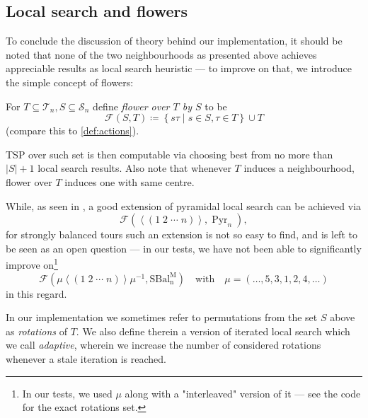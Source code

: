 \documentclass[index=totoc,bibliography=totoc]{scrartcl}
\numberwithin{equation}{section}
\numberwithin{figure}{section}
\numberwithin{table}{section}
\let\defstyle\itshape
\begin{document}
\subsection{Local search and flowers}

To conclude the discussion of theory behind our implementation, it should
be noted that none of the two neighbourhoods as presented above achieves
appreciable results as local search heuristic --- to improve on that, we
introduce the simple concept of flowers:

\begin{define}
  For $T \subseteq \mathcal{T}_n, S \subseteq \mathcal{S}_n$ define
  {\defstyle flower over $T$ by $S$} to be
  \[
    \mathcal{F}\left(S,T\right) \coloneqq
    \left\{ s \tau \mid s \in S, \tau \in T\right\} \cup T
  \]
  (compare this to \cref{def:actions}).
\end{define}

TSP over such set is then computable via choosing best from no
more than $\left|S\right|+1$ local search results.  Also note that whenever
$T$ induces a neighbourhood, flower over $T$ induces one with same centre.

While, as seen in \cite{belperm}, a good extension of pyramidal local
search can be achieved via
\[
  \mathcal{F}\left(
    \left<\left( 1\;2\;\cdots\;n\right)\right>,
    \operatorname{Pyr}_n
  \right),
\]
for strongly balanced tours such an extension is not so easy to find,
and is left to be seen as an open question ---
in our tests, we have not been able to significantly improve
on\footnote{%
  In our tests, we used $\mu$ along with a "interleaved" version of it --- see the code for the exact rotations set.
}
\[
  \mathcal{F}\left(
  \mu
  \left<\left( 1\;2\;\cdots\;n\right)\right>
    \mu^{-1},
    \operatorname{SBal_n^M}
  \right)
  \quad \text{with} \quad
  \mu = \left(\ldots , 5, 3, 1, 2, 4, \ldots\right)
\]
in this regard.

In our implementation we sometimes refer to permutations from the set $S$ above
as {\defstyle rotations} of $T$.
We also define therein a version of iterated local search which we call
{\defstyle adaptive}, wherein we increase the number of considered rotations
whenever a stale iteration is reached.
\end{document}
